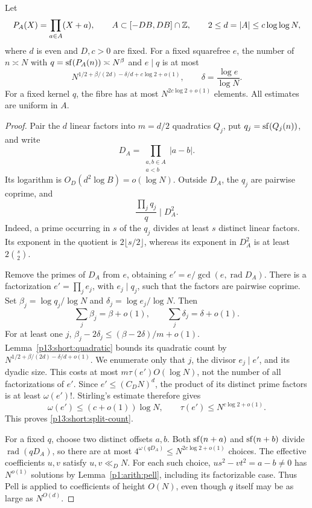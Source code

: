 \begin{lemma}
\label{p13:short:split}
Let
\[
 P_A(X)=\prod_{a\in A}(X+a),\qquad
 A\subset[-DB,DB]\cap\Z,\qquad
 2\le d=|A|\le c\log\log N,
\]
where \(d\) is even and \(D,c>0\) are fixed.
For a fixed squarefree \(e\), the number of \(n\asymp N\)
with \(q=\sf(P_A(n))\asymp N^\beta\) and \(e\mid q\) is at most
\begin{equation}
 N^{1/2+\beta/(2d)-\delta/d+c\log2+o(1)},
 \qquad \delta=\frac{\log e}{\log N}.
 \label{p13:short:split-count}
\end{equation}
For a fixed kernel \(q\), the fibre has at most
\(N^{2c\log2+o(1)}\) elements. All estimates are uniform in \(A\).
\end{lemma}

\begin{proof}
Pair the \(d\) linear factors into \(m=d/2\) quadratics
\(Q_j\), put \(q_j=\sf(Q_j(n))\), and write
\[
 D_A=\prod_{\substack{a,b\in A\\a<b}}|a-b|.
\]
Its logarithm is \(O_D(d^2\log B)=o(\log N)\).
Outside \(D_A\), the \(q_j\) are pairwise coprime, and
\begin{equation}
 \frac{\prod_jq_j}{q}\mid D_A^2.
 \label{p13:short:resultant}
\end{equation}
Indeed, a prime occurring in \(s\) of the \(q_j\) divides at
least \(s\) distinct linear factors. Its exponent in the
quotient is \(2\lfloor s/2\rfloor\), whereas its exponent
in \(D_A^2\) is at least \(2\binom{s}{2}\).

Remove the primes of \(D_A\) from \(e\), obtaining
\(e'=e/\gcd(e,\operatorname{rad}D_A)\).
There is a factorization \(e'=\prod_j e_j\), with
\(e_j\mid q_j\), such that the factors are pairwise coprime.
Set \(\beta_j=\log q_j/\log N\) and
\(\delta_j=\log e_j/\log N\). Then
\[
 \sum_j\beta_j=\beta+o(1),\qquad
 \sum_j\delta_j=\delta+o(1).
\]
For at least one \(j\),
\(\beta_j-2\delta_j\le(\beta-2\delta)/m+o(1)\).
Lemma~\ref{p13:short:quadratic} bounds its quadratic count
by \(N^{1/2+\beta/(2d)-\delta/d+o(1)}\).
We enumerate only that \(j\), the divisor \(e_j\mid e'\),
and its dyadic size. This costs at most
\(m\tau(e')O(\log N)\), not the number of all factorizations
of \(e'\). Since \(e'\le(C_DN)^d\), the product of its distinct
prime factors is at least \(\omega(e')!\). Stirling's estimate
therefore gives
\[
 \omega(e')\le(c+o(1))\log N,\qquad
 \tau(e')\le N^{c\log2+o(1)}.
\]
This proves \eqref{p13:short:split-count}.

For a fixed \(q\), choose two distinct offsets \(a,b\).
Both \(\sf(n+a)\) and \(\sf(n+b)\) divide
\(\operatorname{rad}(qD_A)\), so there are at most
\(4^{\omega(qD_A)}\le N^{2c\log2+o(1)}\) choices.
The effective coefficients \(u,v\) satisfy \(u,v\ll_D N\).
For each such choice,
\(us^2-vt^2=a-b\ne0\) has \(N^{o(1)}\) solutions by
Lemma~\ref{p1:arith:pell}, including its factorizable case.
Thus Pell is applied to coefficients of height \(O(N)\),
even though \(q\) itself may be as large as \(N^{O(d)}\).
\end{proof}

